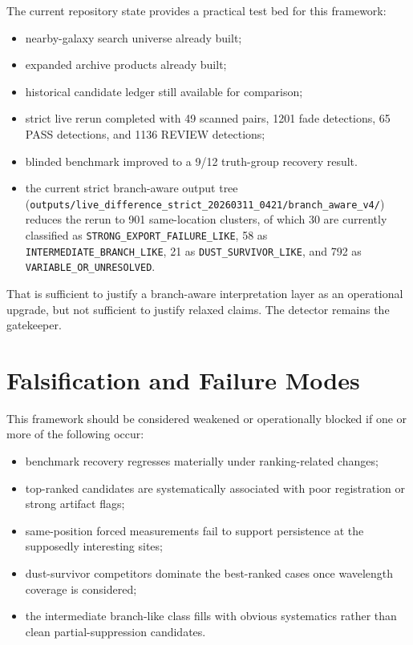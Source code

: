\documentclass[11pt]{article}
\begin{document}
The current repository state provides a practical test bed for this framework:
\begin{itemize}[leftmargin=1.5em]
\item nearby-galaxy search universe already built;
\item expanded archive products already built;
\item historical candidate ledger still available for comparison;
\item strict live rerun completed with 49 scanned pairs, 1201 fade detections, 65 PASS detections, and 1136 REVIEW detections;
\item blinded benchmark improved to a 9/12 truth-group recovery result.
\item the current strict branch-aware output tree (\texttt{outputs/live\_difference\_strict\_20260311\_0421/branch\_aware\_v4/}) reduces the rerun to 901 same-location clusters, of which 30 are currently classified as \texttt{STRONG\_EXPORT\_FAILURE\_LIKE}, 58 as \texttt{INTERMEDIATE\_BRANCH\_LIKE}, 21 as \texttt{DUST\_SURVIVOR\_LIKE}, and 792 as \texttt{VARIABLE\_OR\_UNRESOLVED}.
\end{itemize}

That is sufficient to justify a branch-aware interpretation layer as an operational upgrade, but not sufficient to justify relaxed claims. The detector remains the gatekeeper.

\section{Falsification and Failure Modes}

This framework should be considered weakened or operationally blocked if one or more of the following occur:
\begin{itemize}[leftmargin=1.5em]
\item benchmark recovery regresses materially under ranking-related changes;
\item top-ranked candidates are systematically associated with poor registration or strong artifact flags;
\item same-position forced measurements fail to support persistence at the supposedly interesting sites;
\item dust-survivor competitors dominate the best-ranked cases once wavelength coverage is considered;
\item the intermediate branch-like class fills with obvious systematics rather than clean partial-suppression candidates.
\end{itemize}
\end{document}
